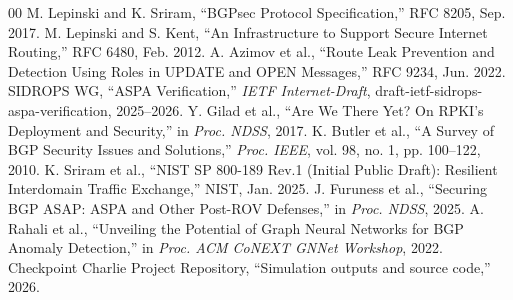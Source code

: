 \documentclass[conference]{IEEEtran}
\begin{document}
\begin{thebibliography}{00}
 M. Lepinski and K. Sriram, ``BGPsec Protocol Specification,'' RFC 8205, Sep. 2017.
 M. Lepinski and S. Kent, ``An Infrastructure to Support Secure Internet Routing,'' RFC 6480, Feb. 2012.
 A. Azimov et al., ``Route Leak Prevention and Detection Using Roles in UPDATE and OPEN Messages,'' RFC 9234, Jun. 2022.
 SIDROPS WG, ``ASPA Verification,'' \textit{IETF Internet-Draft}, draft-ietf-sidrops-aspa-verification, 2025--2026.
 Y. Gilad et al., ``Are We There Yet? On RPKI's Deployment and Security,'' in \textit{Proc. NDSS}, 2017.
 K. Butler et al., ``A Survey of BGP Security Issues and Solutions,'' \textit{Proc. IEEE}, vol. 98, no. 1, pp. 100--122, 2010.
 K. Sriram et al., ``NIST SP 800-189 Rev.1 (Initial Public Draft): Resilient Interdomain Traffic Exchange,'' NIST, Jan. 2025.
 J. Furuness et al., ``Securing BGP ASAP: ASPA and Other Post-ROV Defenses,'' in \textit{Proc. NDSS}, 2025.
 A. Rahali et al., ``Unveiling the Potential of Graph Neural Networks for BGP Anomaly Detection,'' in \textit{Proc. ACM CoNEXT GNNet Workshop}, 2022.
 Checkpoint Charlie Project Repository, ``Simulation outputs and source code,'' 2026.
\end{thebibliography}
\end{document}

